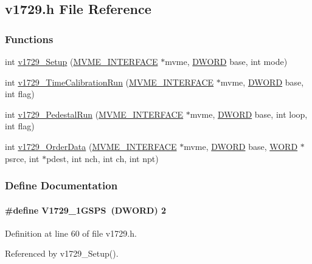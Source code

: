\subsection{v1729.h File Reference}
\label{v1729_8h}
\subsubsection*{Functions}
\begin{DoxyCompactItemize}
\item 
int \hyperlink{v1729_8h_a16a8a323c157ed043a86ac69a6ada37d}{v1729\_\-Setup} (\hyperlink{structMVME__INTERFACE}{MVME\_\-INTERFACE} $\ast$mvme, \hyperlink{vt2_8h_a798af1e30bc65f319c1a246cecf59e39}{DWORD} base, int mode)
\item 
int \hyperlink{v1729_8h_a6a5b223f30c983b7f4dcac408d3f8b9f}{v1729\_\-TimeCalibrationRun} (\hyperlink{structMVME__INTERFACE}{MVME\_\-INTERFACE} $\ast$mvme, \hyperlink{vt2_8h_a798af1e30bc65f319c1a246cecf59e39}{DWORD} base, int flag)
\item 
int \hyperlink{v1729_8h_a135c3c66398c94b6bee6cccad799cfec}{v1729\_\-PedestalRun} (\hyperlink{structMVME__INTERFACE}{MVME\_\-INTERFACE} $\ast$mvme, \hyperlink{vt2_8h_a798af1e30bc65f319c1a246cecf59e39}{DWORD} base, int loop, int flag)
\item 
int \hyperlink{v1729_8h_a00581252de478e322887b9cd6a2242d4}{v1729\_\-OrderData} (\hyperlink{structMVME__INTERFACE}{MVME\_\-INTERFACE} $\ast$mvme, \hyperlink{vt2_8h_a798af1e30bc65f319c1a246cecf59e39}{DWORD} base, \hyperlink{vt2_8h_a2b0e863dadf920709ec53d9088ee7c91}{WORD} $\ast$psrce, int $\ast$pdest, int nch, int ch, int npt)
\end{DoxyCompactItemize}


\subsubsection{Define Documentation}
\paragraph[{V1729\_\-1GSPS}]{\setlength{\rightskip}{0pt plus 5cm}\#define V1729\_\-1GSPS~({\bf DWORD})  2}\hfill\label{v1729_8h_acae77de81e555284c3c6b5513b3f0009}


Definition at line 60 of file v1729.h.

Referenced by v1729\_\-Setup().
